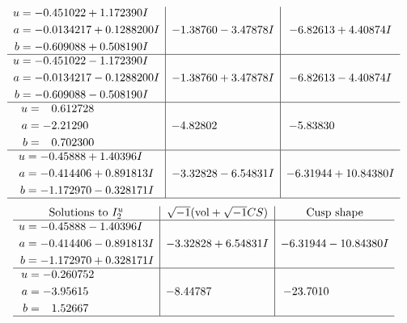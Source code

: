 \documentclass[1p]{elsarticle_modified}
\theoremstyle{definition}
\newcommand{\I}{\sqrt{-1}}
\begin{document}
$$\begin{array}{c|c|c}
\begin{aligned}
u &= -0.451022 + 1.172390 I \\
a &= -0.0134217 + 0.1288200 I \\
b &= -0.609088 + 0.508190 I\end{aligned}
 & -1.38760 - 3.47878 I & -6.82613 + 4.40874 I \\ \hline\begin{aligned}
u &= -0.451022 - 1.172390 I \\
a &= -0.0134217 - 0.1288200 I \\
b &= -0.609088 - 0.508190 I\end{aligned}
 & -1.38760 + 3.47878 I & -6.82613 - 4.40874 I \\ \hline\begin{aligned}
u &= \phantom{-}0.612728\phantom{ +0.000000I} \\
a &= -2.21290\phantom{ +0.000000I} \\
b &= \phantom{-}0.702300\phantom{ +0.000000I}\end{aligned}
 & -4.82802\phantom{ +0.000000I} & -5.83830\phantom{ +0.000000I} \\ \hline\begin{aligned}
u &= -0.45888 + 1.40396 I \\
a &= -0.414406 + 0.891813 I \\
b &= -1.172970 - 0.328171 I\end{aligned}
 & -3.32828 - 6.54831 I & -6.31944 + 10.84380 I\\
 \hline 
 \end{array}$$\newpage$$\begin{array}{c|c|c}  
\text{Solutions to }I^u_{2}& \I (\text{vol} + \sqrt{-1}CS) & \text{Cusp shape}\\
 \hline 
\begin{aligned}
u &= -0.45888 - 1.40396 I \\
a &= -0.414406 - 0.891813 I \\
b &= -1.172970 + 0.328171 I\end{aligned}
 & -3.32828 + 6.54831 I & -6.31944 - 10.84380 I \\ \hline\begin{aligned}
u &= -0.260752\phantom{ +0.000000I} \\
a &= -3.95615\phantom{ +0.000000I} \\
b &= \phantom{-}1.52667\phantom{ +0.000000I}\end{aligned}
 & -8.44787\phantom{ +0.000000I} & -23.7010\phantom{ +0.000000I}\\
 \hline 
 \end{array}$$\newpage
\end{document}
